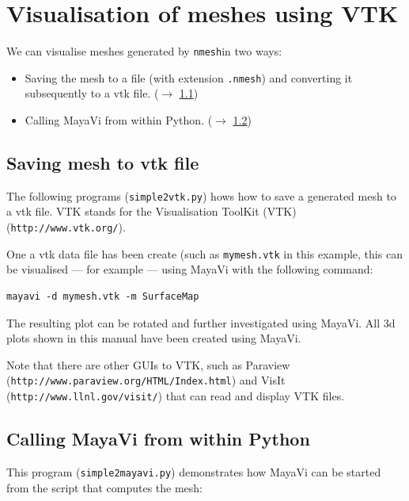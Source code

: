 \documentclass[10pt,a4paper]{book}
\newcommand{\nmesh}{\texttt{nmesh}}
\begin{document}
\section{Visualisation of meshes using VTK}\label{sec:visu-mesh-using}
We can visualise meshes generated by \nmesh in two ways:
\begin{itemize}
\item Saving the mesh to a file (with extension \texttt{.nmesh}) and converting it subsequently to a vtk file. ($\rightarrow$ \ref{sec:savingmeshtovtkfile})
\item Calling MayaVi from within Python. ($\rightarrow$ \ref{sec:callingmayavifromPython})
\end{itemize}

\subsection{Saving mesh to vtk file}
\label{sec:savingmeshtovtkfile}

The following programs (\texttt{simple2vtk.py}) hows how to save a
generated mesh to a vtk file. VTK stands for the Visualisation ToolKit
(VTK) (\texttt{http://www.vtk.org/}).



One a vtk data file has been create (such as \texttt{mymesh.vtk} in this example, this can be visualised --- for example --- using MayaVi with the following command:
\begin{lstlisting}
mayavi -d mymesh.vtk -m SurfaceMap  
\end{lstlisting}

The resulting plot can be rotated and further investigated using MayaVi. All 3d plots shown in this manual have been created using MayaVi.

Note that there are other GUIs to VTK, such as Paraview
(\texttt{http://www.paraview.org/HTML/Index.html}) and VisIt
(\texttt{http://www.llnl.gov/visit/}) that can read and display VTK files.

\subsection{Calling MayaVi from within Python}
\label{sec:callingmayavifromPython}

This program (\texttt{simple2mayavi.py}) demonstrates how MayaVi can be
started from the script that computes the mesh:

\end{document}
